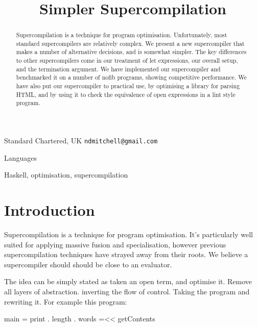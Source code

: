 \documentclass{sigplanconf}
\begin{document}

\titlebanner{\today{} - \currenttime{}}        %
\preprintfooter{}   %

\title{Simpler Supercompilation}

           {Standard Chartered, UK}
           {\verb"ndmitchell@gmail.com"}

\maketitle

\begin{abstract}
Supercompilation is a technique for program optimisation. Unfortunately, most standard supercompilers are relatively complex. We present a new supercompiler that makes a number of alternative decisions, and is somewhat simpler. The key differences to other supercompilers come in our treatment of let expressions, our overall setup, and the termination argument. We have implemented our supercompiler and benchmarked it on a number of nofib programs, showing competitive performance. We have also put our supercompiler to practical use, by optimising a library for parsing HTML, and by using it to check the equivalence of open expressions in a lint style program.
\end{abstract}


\terms
Languages

\keywords
Haskell, optimisation, supercompilation

\section{Introduction}

Supercompilation is a technique for program optimisation. It's particularly well suited for applying massive fusion and specialisation, however previous supercompilation techniques have strayed away from their roots. We believe a supercompiler should should be close to an evaluator.

The idea can be simply stated as taken an open term, and optimise it. Remove all layers of abstraction. inverting the flow of control. Taking the program and rewriting it. For example this program:

\begin{code}
main = print . length . words =<< getContents
\end{code}
\end{document}
